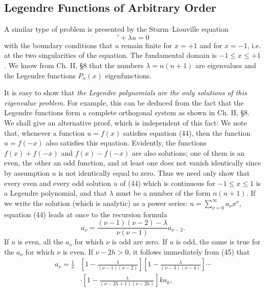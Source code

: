 \subsection{Legendre Functions of Arbitrary Order}
A similar type of problem is presented by the Sturm--Liouville equation
\begin{equation}
[(1-x^2)u']'+\lambda u=0
\tag{44}
\end{equation}
with the boundary conditions that $u$ remain finite for $x=+1$ and for $x=-1$, i.e. at the two singularities of the equation. The fundamental domain is $-1\le x\le +1$. We know from Ch. II, \S8 that the numbers $\lambda=n(n+1)$ are eigenvalues and the Legendre functions $P_n(x)$ eigenfunctions.

It is easy to show that \emph{the Legendre polynomials are the only solutions of this eigenvalue problem}. For example, this can be deduced from the fact that the Legendre functions form a complete orthogonal system as shown in Ch. II, \S8. We shall give an alternative proof, which is independent of this fact: We note that, whenever a function $u=f(x)$ satisfies equation (44), then the function $u=f(-x)$ also satisfies this equation. Evidently, the functions $f(x)+f(-x)$ and $f(x)-f(-x)$ are also solutions; one of them is an even, the other an odd function, and at least one does not vanish identically since by assumption $u$ is not identically equal to zero. Thus we need only show that every even and every odd solution $u$ of (44) which is continuous for $-1\le x\le1$ is a Legendre polynomial, and that $\lambda$ must be a number of the form $n(n+1)$. If we write the solution (which is analytic) as a power series: $u=\sum_{\nu=0}^{\infty}a_\nu x^\nu$, equation (44) leads at once to the recursion formula
\begin{equation}
a_\nu=\frac{(\nu-1)(\nu-2)-\lambda}{\nu(\nu-1)}a_{\nu-2}.
\tag{45}
\end{equation}
If $u$ is even, all the $a_\nu$ for which $\nu$ is odd are zero. If $u$ is odd, the same is true for the $a_\nu$ for which $\nu$ is even. If $\nu-2h>0$, it follows immediately from (45) that
\begin{equation}
\begin{aligned}
a_\nu=\frac1\nu
&\left[1-\frac{\lambda}{(\nu-1)(\nu-2)}\right]
\left[1-\frac{\lambda}{(\nu-3)(\nu-4)}\right]\cdots\\
&\cdot\left[1-\frac{\lambda}{(\nu-2h+1)(\nu-2h)}\right]ka_k,
\end{aligned}
\tag{46}
\end{equation}
